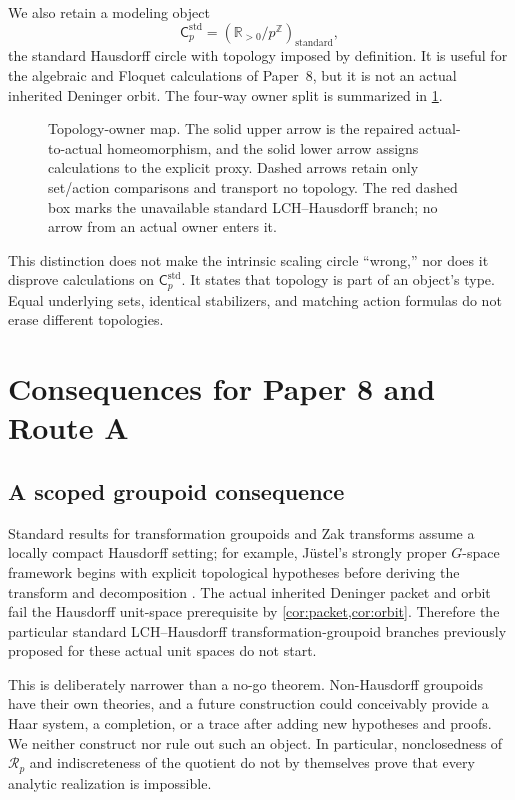 \documentclass[11pt]{article}
\theoremstyle{definition}
\newcommand{\R}{\mathbb{R}}
\newcommand{\Z}{\mathbb{Z}}
\newcommand{\Rp}{\mathcal R_p}
\begin{document}
We also retain a modeling object
\[
 \mathsf C_p^{\mathrm{std}}=(\R_{>0}/p^{\Z})_{\mathrm{standard}},
\]
the standard Hausdorff circle with topology imposed by definition.  It is useful for the algebraic and Floquet calculations of Paper~8, but it is not an actual inherited Deninger orbit.  The four-way owner split is summarized in \cref{fig:owners}.

\begin{figure}[htbp]
\centering
\resizebox{0.96\textwidth}{!}{}
\caption{Topology-owner map.  The solid upper arrow is the repaired actual-to-actual homeomorphism, and the solid lower arrow assigns calculations to the explicit proxy.  Dashed arrows retain only set/action comparisons and transport no topology.  The red dashed box marks the unavailable standard LCH--Hausdorff branch; no arrow from an actual owner enters it.}\label{fig:owners}
\end{figure}

This distinction does not make the intrinsic scaling circle ``wrong,'' nor does it disprove calculations on \(\mathsf C_p^{\mathrm{std}}\).  It states that topology is part of an object's type.  Equal underlying sets, identical stabilizers, and matching action formulas do not erase different topologies.

\section{Consequences for Paper 8 and Route A}\label{sec:corrigendum}

\subsection{A scoped groupoid consequence}

Standard results for transformation groupoids and Zak transforms assume a locally compact Hausdorff setting; for example, Jüstel's strongly proper \(G\)-space framework begins with explicit topological hypotheses before deriving the transform and decomposition \cite[Definition~2.1, Lemma~2.3, and Theorem~2.4, physical pp.~3--6]{Justel2018}.  The actual inherited Deninger packet and orbit fail the Hausdorff unit-space prerequisite by \cref{cor:packet,cor:orbit}.  Therefore the particular standard LCH--Hausdorff transformation-groupoid branches previously proposed for these actual unit spaces do not start.

This is deliberately narrower than a no-go theorem.  Non-Hausdorff groupoids have their own theories, and a future construction could conceivably provide a Haar system, a completion, or a trace after adding new hypotheses and proofs.  We neither construct nor rule out such an object.  In particular, nonclosedness of \(\Rp\) and indiscreteness of the quotient do not by themselves prove that every analytic realization is impossible.
\end{document}
